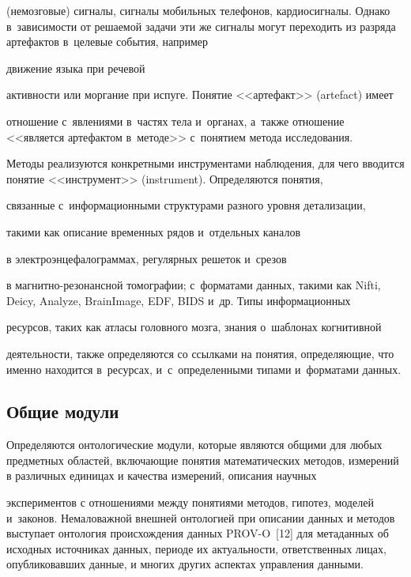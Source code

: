  (немозговые) сигналы, сигналы мобильных телефонов, кардиосигналы. Однако в~зависимости от решаемой задачи эти же сигналы могут переходить из разряда артефактов в~целевые события, например

  движение языка при речевой 

активности или моргание при испуге. Понятие <<артефакт>> (artefact) имеет 

отношение с~явлениями в~частях тела и~органах, а~также отношение <<является артефактом в~методе>> с~понятием метода исследования.

      

      Методы реализуются конкретными инструментами наблюдения, для чего вводится понятие <<инструмент>> (instrument). Определяются понятия,

 связанные с~информационными структурами разного уровня детализации, 

такими как описание временных рядов и~отдельных каналов 

в электроэнцефалограммах, регулярных решеток и~срезов 

в маг\-нит\-но-ре\-зо\-нанс\-ной томографии; с~форматами данных, такими как Nifti, Deicy, Analyze, BrainImage, EDF, BIDS и~др. Типы информационных 

ресурсов, таких как атласы головного мозга, знания о~шаблонах когнитивной

 деятельности, также определяются со ссылками на понятия, определяющие, что именно находится в~ресурсах, и~с~определенными типами и~форматами данных.



\subsection{Общие модули}



      Определяются онтологические модули, которые являются общими для любых предметных областей, включающие понятия математических методов, измерений в различных единицах и качества измерений, описания научных 

экспериментов с отношениями между понятиями методов, гипотез, моделей и~законов. Немаловажной внешней онтологией при описании данных и методов выступает онтология происхождения данных PROV-O~[12] для метаданных об исходных источниках данных, периоде их актуальности, ответственных лицах, опубликовавших данные, и многих других аспектах управления данными.



